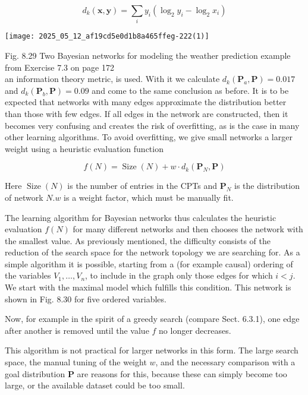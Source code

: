 \documentclass[10pt]{article}
\begin{document}
$$
d_{k}(\boldsymbol{x}, \boldsymbol{y})=\sum_{i} y_{i}\left(\log _{2} y_{i}-\log _{2} x_{i}\right)
$$

\begin{center}
\texttt{[image: 2025\_05\_12\_af19cd5e0d1b8a465ffeg-222(1)]}
\end{center}

Fig. 8.29 Two Bayesian networks for modeling the weather prediction example from Exercise 7.3 on page 172\\
an information theory metric, is used. With it we calculate $d_{k}\left(\boldsymbol{P}_{a}, \boldsymbol{P}\right)=0.017$ and $d_{k}\left(\boldsymbol{P}_{b}, \boldsymbol{P}\right)=0.09$ and come to the same conclusion as before. It is to be expected that networks with many edges approximate the distribution better than those with few edges. If all edges in the network are constructed, then it becomes very confusing and creates the risk of overfitting, as is the case in many other learning algorithms. To avoid overfitting, we give small networks a larger weight using a heuristic evaluation function

$$
f(N)=\operatorname{Size}(N)+w \cdot d_{k}\left(\boldsymbol{P}_{N}, \boldsymbol{P}\right)
$$

Here $\operatorname{Size}(N)$ is the number of entries in the CPTs and $\boldsymbol{P}_{N}$ is the distribution of network $N . w$ is a weight factor, which must be manually fit.

The learning algorithm for Bayesian networks thus calculates the heuristic evaluation $f(N)$ for many different networks and then chooses the network with the smallest value. As previously mentioned, the difficulty consists of the reduction of the search space for the network topology we are searching for. As a simple algorithm it is possible, starting from a (for example causal) ordering of the variables $V_{1}, \ldots, V_{n}$, to include in the graph only those edges for which $i<j$. We start with the maximal model which fulfills this condition. This network is shown in Fig. 8.30 for five ordered variables.

Now, for example in the spirit of a greedy search (compare Sect. 6.3.1), one edge after another is removed until the value $f$ no longer decreases.

This algorithm is not practical for larger networks in this form. The large search space, the manual tuning of the weight $w$, and the necessary comparison with a goal distribution $\boldsymbol{P}$ are reasons for this, because these can simply become too large, or the available dataset could be too small.
\end{document}
